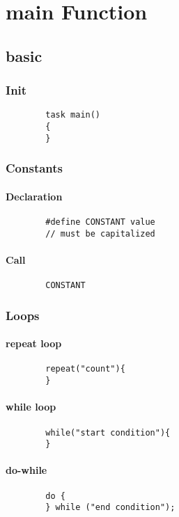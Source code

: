 \chapter{main Function}
\section{basic}

	\subsection{Init}
	\begin{lstlisting}
		task main()
		{
		}
  \end{lstlisting}

	\subsection{Constants}
	\subsubsection{Declaration}
	\begin{lstlisting}
		#define CONSTANT value
		// must be capitalized
	\end{lstlisting}
	\subsubsection{Call}
	\begin{lstlisting}
		CONSTANT
	\end{lstlisting}

	\subsection{Loops}
	\subsubsection{repeat loop}
	\begin{lstlisting}
		repeat("count"){
		}
	\end{lstlisting}
	\subsubsection{while loop}
	\begin{lstlisting}
		while("start condition"){
		}
	\end{lstlisting}
	\subsubsection{do-while}
	\begin{lstlisting}
		do {
		} while ("end condition");
	\end{lstlisting}
